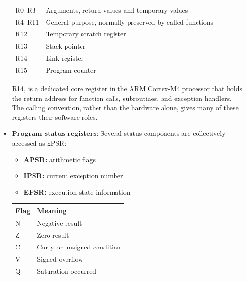 \documentclass{report}
\begin{document}
\begin{itemize}
\begin{center}
\begin{tabularx}{\textwidth}{@{}XX@{}}
                    \midrule
                    R0–R3	&Arguments, return values and temporary values\\[2ex]
                    R4–R11	&General-purpose, normally preserved by called functions\\[2ex]
                    R12	&Temporary scratch register\\[2ex]
                    R13	&Stack pointer\\[2ex]
                    R14	&Link register\\[2ex]
                    R15	&Program counter \\
                    \bottomrule
                \end{tabularx}
            \end{center}
            R14, is a dedicated core register in the ARM Cortex-M4 processor that holds the return address for function calls, subroutines, and exception handlers. 
            \bigbreak \noindent 
            The calling convention, rather than the hardware alone, gives many of these registers their software roles.
        \item \textbf{Program status registers}: Several status components are collectively accessed as xPSR:
            \begin{itemize}
                \item \textbf{APSR:} arithmetic flags
                \item \textbf{IPSR:} current exception number
                \item \textbf{EPSR:} execution-state information
            \end{itemize}
            \begin{center}
                \begin{tabularx}{\textwidth}{@{}XX@{}}
                    \toprule
                    \textbf{Flag}&	\textbf{Meaning} \\
                    \midrule
                    N	&Negative result\\[2ex]
                    Z	&Zero result\\[2ex]
                    C	&Carry or unsigned condition\\[2ex]
                    V	&Signed overflow\\[2ex]
                    Q	&Saturation occurred \\
                    \bottomrule
                \end{tabularx}
            \end{center}

\end{itemize}
\end{document}
